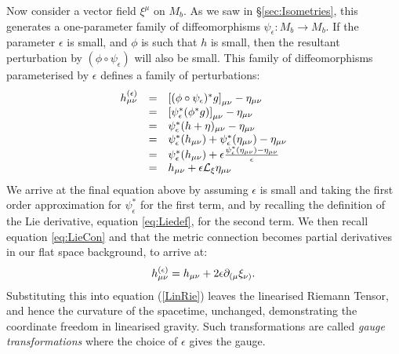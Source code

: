Now consider a vector field $\xi^\mu$ on $M_b$. As we saw in {\S}\ref{sec:Isometries}, this generates a one-parameter family of diffeomorphisms $\psi_\epsilon : M_b \rightarrow M_b$. If the parameter $\epsilon$ is small, and $\phi$ is such that $h$ is small, then the resultant perturbation by $(\phi \circ \psi_\epsilon)$ will also be small. This family of diffeomorphisms parameterised by $\epsilon$ defines a family of perturbations:
\begin{equation}
\begin{array}{lcl}
h^{(\epsilon)}_{\mu \nu} &=&\left[ (\phi \circ \psi_\epsilon)^{*}g\right]_{\mu \nu}-\eta_{\mu \nu} \\
&=& \left[ \psi_\epsilon^{*}(\phi^{*} g ) \right]_{\mu \nu}-\eta_{\mu \nu}\\
&=& \psi_\epsilon^{*}(h+\eta)_{\mu \nu} - \eta_{\mu \nu} \\
&=& \psi_\epsilon^{*}(h_{\mu \nu}) + \psi_\epsilon^{*}(\eta_{\mu \nu}) - \eta_{\mu \nu} \\
&=& \psi_\epsilon^{*}(h_{\mu \nu}) + \epsilon  \frac{\psi_\epsilon^{*}(\eta_{\mu \nu}) - \eta_{\mu \nu}}{\epsilon} \\
&=& h_{\mu \nu} + \epsilon {\mathcal{L}}_\xi \eta_{\mu \nu}
\end{array}
\end{equation}
We arrive at the final equation above by assuming $\epsilon$ is small and taking the first order approximation for $\psi^{*}_\epsilon$ for the first term, and by recalling the definition of the Lie derivative, equation \ref{eq:Liedef}, for the second term. We then recall equation \ref{eq:LieCon} and that the metric connection becomes partial derivatives in our flat space background, to arrive at:
\begin{equation}
h^{(\epsilon)}_{\mu \nu} =  h_{\mu \nu} + 2 \epsilon {\partial}_{(\mu} \xi_{\nu)}.
\label{eq:GaugeTF}
\end{equation}
Substituting this into equation (\ref{LinRie}) leaves the linearised Riemann Tensor, and hence the curvature of the spacetime, unchanged, demonstrating the coordinate freedom in linearised gravity. Such transformations are called \emph{gauge transformations} where the choice of $\epsilon$ gives the gauge.

